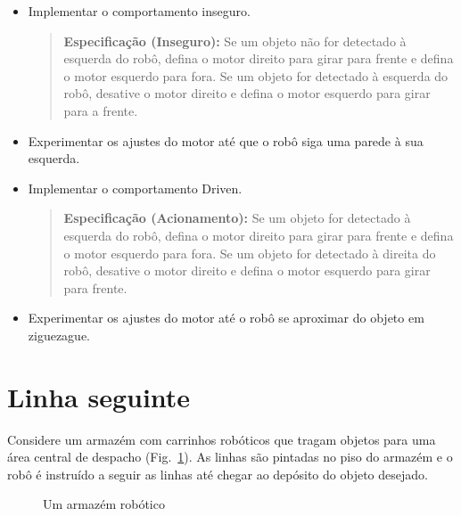 \begin{framed}
\begin{itemize}
\item Implementar o comportamento inseguro.
\begin{quote}
\normalsize\noindent\textbf{Especificação (Inseguro):} Se um objeto não for detectado à esquerda do robô, defina o motor direito para girar para frente e defina o motor esquerdo para fora. Se um objeto for detectado à esquerda do robô, desative o motor direito e defina o motor esquerdo para girar para a frente.
\end{quote}
\item Experimentar os ajustes do motor até que o robô siga uma parede à sua esquerda.
\end{itemize}
\end{framed}

\begin{framed}
\begin{itemize}
\item Implementar o comportamento Driven.
\begin{quote}
\normalsize\noindent\textbf{Especificação (Acionamento):} Se um objeto for detectado à esquerda do robô, defina o motor direito para girar para frente e defina o motor esquerdo para fora. Se um objeto for detectado à direita do robô, desative o motor direito e defina o motor esquerdo para girar para frente.
\end{quote}
\item Experimentar os ajustes do motor até o robô se aproximar do objeto em ziguezague.
\end{itemize}
\end{framed}

\section{Linha seguinte}\label{s.line}

Considere um armazém com carrinhos robóticos que tragam objetos para uma área central de despacho (Fig.~\ref{fig.warehouse}). As linhas são pintadas no piso do armazém e o robô é instruído a seguir as linhas até chegar ao depósito do objeto desejado.

\begin{figure}
\begin{center}
\caption{Um armazém robótico}\label{fig.warehouse}
\end{center}
\end{figure}

